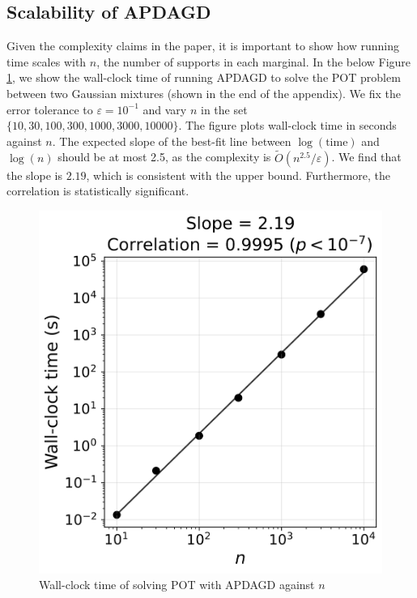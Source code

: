 \subsection{Scalability of APDAGD}
Given the complexity claims in the paper, it is important to show how running time scales with $n$, the number of supports in each marginal. In the below Figure \ref{fig:scalability}, we show the wall-clock time of running APDAGD to solve the POT problem between two Gaussian mixtures (shown in the end of the appendix). We fix the error tolerance to $\varepsilon = 10^{-1}$ and vary $n$ in the set $\{ 10, 30, 100, 300, 1000, 3000, 10000 \}$. The figure plots wall-clock time in seconds against $n$. The expected slope of the best-fit line between $\log(\text{time})$ and $\log(n)$ should be at most 2.5, as the complexity is $\widetilde{O}(n^{2.5} / \varepsilon)$. We find that the slope is $2.19$, which is consistent with the upper bound. Furthermore, the correlation is statistically significant.

\begin{figure}
    \centering
    \includegraphics[width=0.4\linewidth]{figs/scalability.png}
    \caption{Wall-clock time of solving POT with APDAGD against $n$}
    \label{fig:scalability}
\end{figure}

\newpage

